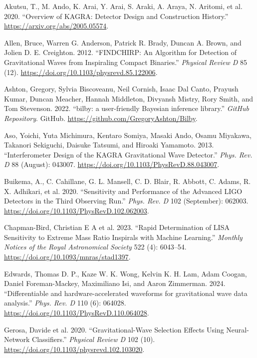 \documentclass[10pt,a4paper,onecolumn]{article}
\newlength{\cslhangindent}
\newenvironment{CSLReferences}[3] %
 {%
  \setlength{\parindent}{0pt}
  \ifodd #1 \everypar{\setlength{\hangindent}{\cslhangindent}}\ignorespaces\fi
  \ifnum #2 > 0
  \setlength{\parskip}{#2\baselineskip}
  \fi
 }%
 {}
\begin{document}
\begin{CSLReferences}{1}{0}
\bibitem[\citeproctext]{ref-akutsu2020overviewkagradetectordesign}
Akutsu, T., M. Ando, K. Arai, Y. Arai, S. Araki, A. Araya, N. Aritomi,
et al. 2020. {``Overview of KAGRA: Detector Design and Construction
History.''} \url{https://arxiv.org/abs/2005.05574}.

Allen, Bruce, Warren G. Anderson, Patrick R. Brady, Duncan A. Brown, and
Jolien D. E. Creighton. 2012. {``FINDCHIRP: An Algorithm for Detection
of Gravitational Waves from Inspiraling Compact Binaries.''}
\emph{Physical Review D} 85 (12).
\url{https://doi.org/10.1103/physrevd.85.122006}.

Ashton, Gregory, Sylvia Biscoveanu, Neil Cornish, Isaac Dal Canto,
Prayush Kumar, Duncan Meacher, Hannah Middleton, Divyansh Mistry, Rory
Smith, and Tom Stevenson. 2022. {``{bilby: a user-friendly Bayesian
inference library}.''} \emph{GitHub Repository}. GitHub.
\url{https://github.com/GregoryAshton/Bilby}.

Aso, Yoichi, Yuta Michimura, Kentaro Somiya, Masaki Ando, Osamu
Miyakawa, Takanori Sekiguchi, Daisuke Tatsumi, and Hiroaki Yamamoto.
2013. {``Interferometer Design of the KAGRA Gravitational Wave
Detector.''} \emph{Phys. Rev. D} 88 (August): 043007.
\url{https://doi.org/10.1103/PhysRevD.88.043007}.

Buikema, A., C. Cahillane, G. L. Mansell, C. D. Blair, R. Abbott, C.
Adams, R. X. Adhikari, et al. 2020. {``Sensitivity and Performance of
the Advanced LIGO Detectors in the Third Observing Run.''} \emph{Phys.
Rev. D} 102 (September): 062003.
\url{https://doi.org/10.1103/PhysRevD.102.062003}.

Chapman-Bird, Christian E A et al. 2023. {``Rapid Determination of LISA
Sensitivity to Extreme Mass Ratio Inspirals with Machine Learning.''}
\emph{Monthly Notices of the Royal Astronomical Society} 522 (4):
6043--54. \url{https://doi.org/10.1093/mnras/stad1397}.

Edwards, Thomas D. P., Kaze W. K. Wong, Kelvin K. H. Lam, Adam Coogan,
Daniel Foreman-Mackey, Maximiliano Isi, and Aaron Zimmerman. 2024.
{``{Differentiable and hardware-accelerated waveforms for gravitational
wave data analysis}.''} \emph{Phys. Rev. D} 110 (6): 064028.
\url{https://doi.org/10.1103/PhysRevD.110.064028}.

Gerosa, Davide et al. 2020. {``Gravitational-Wave Selection Effects
Using Neural-Network Classifiers.''} \emph{Physical Review D} 102 (10).
\url{https://doi.org/10.1103/physrevd.102.103020}.


\end{CSLReferences}
\end{document}
